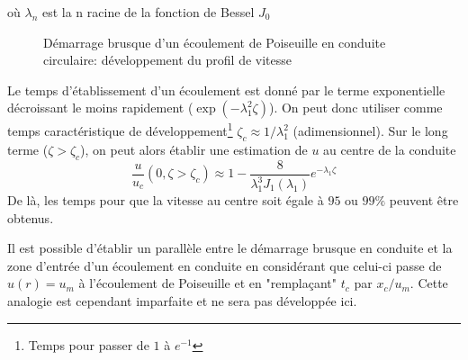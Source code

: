       où $\lambda_n$ est la n racine de la fonction de Bessel $J_0$
      \begin{figure}[!h]
        \centering
        
        \caption{Démarrage brusque d'un écoulement de Poiseuille en conduite circulaire: développement du profil de vitesse}
      \end{figure}
      Le temps d'établissement d'un écoulement est donné par le terme exponentielle décroissant le moins rapidement ($\exp(-\lambda_1^2 \zeta)$). On peut donc utiliser comme temps caractéristique de développement\footnote{Temps pour passer de $1$ à $e^{-1}$} $\zeta_c \approx 1/\lambda^2_1$ (adimensionnel). Sur le long terme ($\zeta > \zeta_c$), on peut alors établir une estimation de $u$ au centre de la conduite
      \begin{equation}
        \frac{u}{u_c}(0, \zeta>\zeta_c) \approx 1 - \frac{8}{\lambda_1^3 J_1(\lambda_1)}e^{-\lambda_1\zeta}
      \end{equation}
      De là, les temps pour que la vitesse au centre soit égale à $95$ ou $99\%$ peuvent être obtenus.

      Il est possible d'établir un parallèle entre le démarrage brusque en conduite et la zone d'entrée d'un écoulement en conduite en considérant que celui-ci passe de $u(r)= u_m$ à l'écoulement de Poiseuille et en "remplaçant" $t_c$ par $x_c/u_m$. Cette analogie est cependant imparfaite et ne sera pas développée ici.

